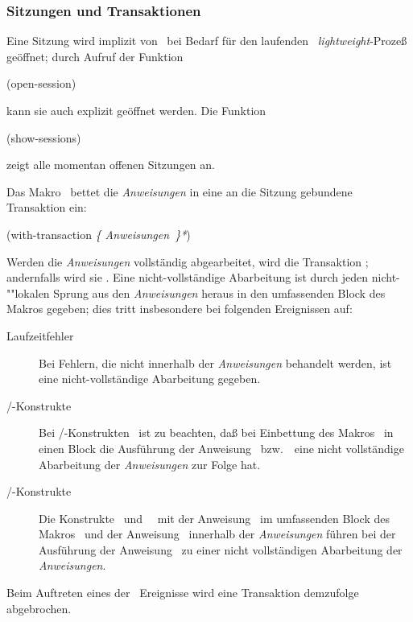 \subsubsection{Sitzungen und Transaktionen}
%
Eine Sitzung wird implizit von \plob\ bei Bedarf f\"{u}r den laufenden
\lw\ {\em lightweight\/}-Proze\ss{} ge\"{o}ffnet; durch Aufruf der Funktion
%
\begin{listing}[\tt]%
(open-session)
\end{listing}%
%
\noindent kann sie auch explizit ge\"{o}ffnet werden. Die Funktion
%
\begin{listing}[\tt]%
(show-sessions)
\end{listing}%
%
\noindent zeigt alle momentan offenen Sitzungen an.
%
\par{}Das Makro \ bettet die
{\it\lt{}Anweisungen\gt\/} in eine an die Sitzung gebundene
Transaktion ein:
%
\begin{listing}[\tt]%
(with-transaction {\rm\it\{ \lt{}Anweisungen\gt\ \}*\/})
\end{listing}%
%
\noindent Werden die {\it\lt{}An\-wei\-sun\-gen\gt\/} vollst\"{a}ndig
abgearbeitet, wird die Transaktion ;
andernfalls wird sie . Eine
nicht-vollst\"{a}ndige Abarbeitung ist durch jeden nicht-""lo\-ka\-len
Sprung aus den {\it\lt{}Anweisungen\gt\/} heraus in den umfassenden
Block des Makros gegeben; dies tritt insbesondere bei folgenden
Ereignissen auf:
\begin{description}
%
\item[Laufzeitfehler]
Bei Fehlern, die nicht innerhalb der {\it\lt{}Anweisungen\gt\/}
behandelt werden, ist eine nicht-vollst\"{a}ndige Abarbeitung gegeben.
%
\item[/-Konstrukte]
Bei /-Konstrukten \ ist zu
beachten, da\ss{} bei Einbettung des Makros \ in
einen Block die Ausf\"{u}hrung der Anweisung
\ bzw.\ \ eine nicht
vollst\"{a}ndige Abarbeitung der {\it\lt{}An\-wei\-sun\-gen\gt\/} zur
Folge hat.
%
\item[/-Konstrukte]
Die Konstrukte \ und \ \ mit der
Anweisung \  im umfassenden Block des Makros
\ und der Anweisung \ innerhalb der
{\it\lt{}Anweisungen\gt\/} f\"{u}hren bei der Ausf\"{u}hrung der Anweisung
\ zu einer nicht vollst\"{a}ndigen Abarbeitung der
{\it\lt{}Anweisungen\gt}.
%
\end{description}
Beim Auftreten eines der \og[en]\ Ereignisse wird eine Transaktion
demzufolge abgebrochen.
%
